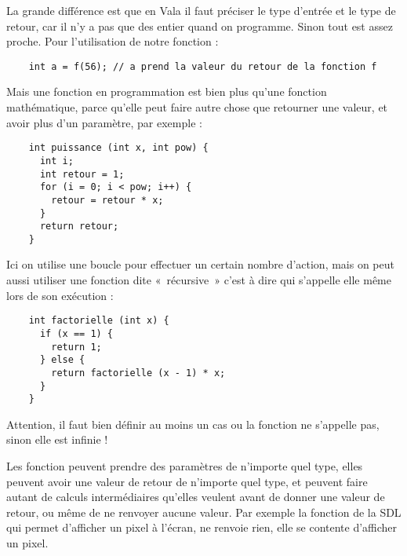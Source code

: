   La grande différence est que en Vala il faut préciser le type d'entrée et le type de retour, car il n'y a pas que des entier quand on programme. Sinon tout est assez proche. Pour l'utilisation de notre fonction :
  \begin{lstlisting}
    int a = f(56); // a prend la valeur du retour de la fonction f
  \end{lstlisting}
  
  Mais une fonction en programmation est bien plus qu'une fonction mathématique, parce qu'elle peut faire autre chose que retourner une valeur, et avoir plus d'un paramètre, par exemple :
  \begin{lstlisting}
    int puissance (int x, int pow) {
      int i;
      int retour = 1;
      for (i = 0; i < pow; i++) {
        retour = retour * x;
      }
      return retour;
    }
  \end{lstlisting}
  
  Ici on utilise une boucle pour effectuer un certain nombre d'action, mais on peut aussi utiliser une fonction dite «~récursive~» c'est à dire qui s'appelle elle même lors de son exécution : 
  \begin{lstlisting}
    int factorielle (int x) {
      if (x == 1) { 
        return 1;
      } else {
        return factorielle (x - 1) * x;
      }
    }
  \end{lstlisting}
  
  Attention, il faut bien définir au moins un cas ou la fonction ne s'appelle pas, sinon elle est infinie !
  
  Les fonction peuvent prendre des paramètres de n'importe quel type, elles peuvent avoir une valeur de retour de n'importe quel type, et peuvent faire autant de calculs intermédiaires qu'elles veulent avant de donner une valeur de retour, ou même de ne renvoyer aucune valeur. Par exemple la fonction de la SDL qui permet d'afficher un pixel à l'écran, ne renvoie rien, elle se contente d'afficher un pixel.
